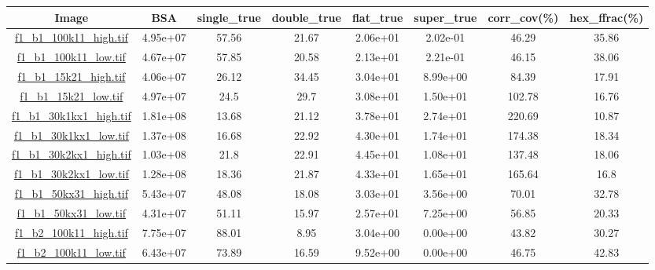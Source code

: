 \begin{table}[h]
\scriptsize
\begin{adjustwidth}{-1cm}{}
\hypertarget{covtableaug_13_12}{\;}
\begin{tabular}{ |c |c |c |c |c |c |c |c |} \hline
{ \bf Image } & { \bf BSA } & { \bf single\_true } & { \bf double\_true } & { \bf flat\_true } & { \bf super\_true } & { \bf corr\_cov(\%) } & { \bf hex\_ffrac(\%) }\\ \hline
{\hyperlink{histf1_b1_100k11_high}{\color{blue}f1\_b1\_100k11\_high.tif}} & 4.95e+07 & 57.56 & 21.67 & 2.06e+01 & 2.02e-01 & 46.29 & 35.86\\ \hline
{\hyperlink{histf1_b1_100k11_low}{\color{blue}f1\_b1\_100k11\_low.tif}} & 4.67e+07 & 57.85 & 20.58 & 2.13e+01 & 2.21e-01 & 46.15 & 38.06\\ \hline
{\hyperlink{histf1_b1_15k21_high}{\color{blue}f1\_b1\_15k21\_high.tif}} & 4.06e+07 & 26.12 & 34.45 & 3.04e+01 & 8.99e+00 & 84.39 & 17.91\\ \hline
{\hyperlink{histf1_b1_15k21_low}{\color{blue}f1\_b1\_15k21\_low.tif}} & 4.97e+07 & 24.5 & 29.7 & 3.08e+01 & 1.50e+01 & 102.78 & 16.76\\ \hline
{\hyperlink{histf1_b1_30k1kx1_high}{\color{blue}f1\_b1\_30k1kx1\_high.tif}} & 1.81e+08 & 13.68 & 21.12 & 3.78e+01 & 2.74e+01 & 220.69 & 10.87\\ \hline
{\hyperlink{histf1_b1_30k1kx1_low}{\color{blue}f1\_b1\_30k1kx1\_low.tif}} & 1.37e+08 & 16.68 & 22.92 & 4.30e+01 & 1.74e+01 & 174.38 & 18.34\\ \hline
{\hyperlink{histf1_b1_30k2kx1_high}{\color{blue}f1\_b1\_30k2kx1\_high.tif}} & 1.03e+08 & 21.8 & 22.91 & 4.45e+01 & 1.08e+01 & 137.48 & 18.06\\ \hline
{\hyperlink{histf1_b1_30k2kx1_low}{\color{blue}f1\_b1\_30k2kx1\_low.tif}} & 1.28e+08 & 18.36 & 21.87 & 4.33e+01 & 1.65e+01 & 165.64 & 16.8\\ \hline
{\hyperlink{histf1_b1_50kx31_high}{\color{blue}f1\_b1\_50kx31\_high.tif}} & 5.43e+07 & 48.08 & 18.08 & 3.03e+01 & 3.56e+00 & 70.01 & 32.78\\ \hline
{\hyperlink{histf1_b1_50kx31_low}{\color{blue}f1\_b1\_50kx31\_low.tif}} & 4.31e+07 & 51.11 & 15.97 & 2.57e+01 & 7.25e+00 & 56.85 & 20.33\\ \hline
{\hyperlink{histf1_b2_100k11_high}{\color{blue}f1\_b2\_100k11\_high.tif}} & 7.75e+07 & 88.01 & 8.95 & 3.04e+00 & 0.00e+00 & 43.82 & 30.27\\ \hline
{\hyperlink{histf1_b2_100k11_low}{\color{blue}f1\_b2\_100k11\_low.tif}} & 6.43e+07 & 73.89 & 16.59 & 9.52e+00 & 0.00e+00 & 46.75 & 42.83\\ \hline

\end{tabular}
\end{adjustwidth}
\end{table}
